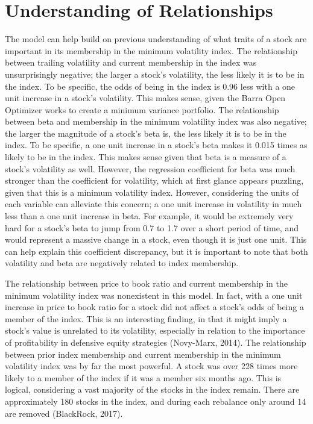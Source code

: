 \documentclass[12pt,twoside]{reedthesis}
\theoremstyle{definition}
\theoremstyle{definition}
\theoremstyle{definition}
\theoremstyle{remark}
\begin{document}
\section{Understanding of
Relationships}\label{understanding-of-relationships}

The model can help build on previous understanding of what traits of a
stock are important in its membership in the minimum volatility index.
The relationship between trailing volatility and current membership in
the index was unsurprisingly negative; the larger a stock's volatility,
the less likely it is to be in the index. To be specific, the odds of
being in the index is 0.96 less with a one unit increase in a stock's
volatility. This makes sense, given the Barra Open Optimizer works to
create a minimum variance portfolio. The relationship between beta and
membership in the minimum volatility index was also negative; the larger
the magnitude of a stock's beta is, the less likely it is to be in the
index. To be specific, a one unit increase in a stock's beta makes it
0.015 times as likely to be in the index. This makes sense given that
beta is a measure of a stock's volatility as well. However, the
regression coefficient for beta was much stronger than the coefficient
for volatility, which at first glance appears puzzling, given that this
is a minimum volatility index. However, considering the units of each
variable can alleviate this concern; a one unit increase in volatility
in much less than a one unit increase in beta. For example, it would be
extremely very hard for a stock's beta to jump from 0.7 to 1.7 over a
short period of time, and would represent a massive change in a stock,
even though it is just one unit. This can help explain this coefficient
discrepancy, but it is important to note that both volatility and beta
are negatively related to index membership.

The relationship between price to book ratio and current membership in
the minimum volatility index was nonexistent in this model. In fact,
with a one unit increase in price to book ratio for a stock did not
affect a stock's odds of being a member of the index. This is an
interesting finding, in that it might imply a stock's value is unrelated
to its volatility, especially in relation to the importance of
profitability in defensive equity strategies (Novy-Marx, 2014). The
relationship between prior index membership and current membership in
the minimum volatility index was by far the most powerful. A stock was
over 228 times more likely to a member of the index if it was a member
six months ago. This is logical, considering a vast majority of the
stocks in the index remain. There are approximately 180 stocks in the
index, and during each rebalance only around 14 are removed (BlackRock,
2017).
\end{document}
